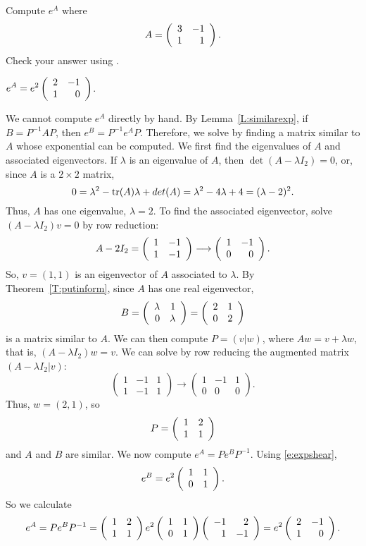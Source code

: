 \documentclass{ximera}
\begin{document}
\begin{exercise} \label{c6.5.6}
Compute $e^A$ where
\[
A = \left(\begin{array}{rr} 3 & -1\\ 1 &1\end{array}\right).
\]
Check your answer using \Matlabp.

\begin{solution}

\ans $\displaystyle e^A = e^2\left(\begin{array}{rr} 2 & -1\\ 1 &0\end{array}\right)$.

\soln We cannot compute $e^A$ directly by hand.  By Lemma~\ref{L:similarexp},
if $B = P^{-1}AP$, then $e^B = P^{-1}e^AP$.  Therefore, we solve by
finding a matrix similar to $A$ whose exponential can be computed.  
We first find the eigenvalues of $A$ and associated eigenvectors.
If $\lambda$ is an eigenvalue of $A$, then $\det(A - \lambda I_2) =
0$, or, since $A$ is a $2 \times 2$ matrix,
\[ 0 = \lambda^2 - {\rm tr}(A)\lambda + det(A) = \lambda^2 - 4\lambda +
4 = (\lambda - 2)^2. \]
Thus, $A$ has one eigenvalue, $\lambda = 2$.  To find the associated
eigenvector, solve $(A - \lambda I_2)v = 0$ by row reduction:
\[ A - 2I_2 = \left(\begin{array}{rr} 1 & -1\\ 1 &-1\end{array}\right) \longrightarrow
\left(\begin{array}{rr} 1 & -1\\ 0 &0\end{array}\right). \]
So, $v = (1,1)$ is an eigenvector of $A$ associated to $\lambda$.
By Theorem~\ref{T:putinform}, since $A$
has one real eigenvector, 
\[ B = \left(\begin{array}{rr} \lambda & 1\\ 0 &\lambda\end{array}\right) = \left(\begin{array}{rr} 2 & 1\\ 0 &2\end{array}\right) \]
is a matrix similar to $A$.  We can then compute $P = (v|w)$, where
$Aw = v + \lambda w$, that is, $(A - \lambda I_2)w = v$.  We can solve
by row reducing the augmented matrix $(A - \lambda I_2|v)$:
\[ \left(\begin{array}{rr|r} 1 & -1 & 1 \\ 1 & -1 & 1 \end{array}
\right) \longrightarrow \left(\begin{array}{rr|r} 1 & -1 & 1 \\
0 & 0 & 0 \end{array}\right). \]
Thus, $w = (2,1)$, so
\[ P = \left(\begin{array}{rr} 1 & 2\\ 1 &1\end{array}\right) \]
and $A$ and $B$ are similar.
We now compute $e^A = Pe^BP^{-1}$.  Using \eqref{e:expshear},
\[ e^B = e^2\left(\begin{array}{rr} 1 & 1\\ 0 &1\end{array}\right). \]
So we calculate 
\[ e^A = Pe^BP^{-1} = \left(\begin{array}{rr} 1 & 2\\ 1 &1\end{array}\right)e^2\left(\begin{array}{rr} 1 & 1\\ 0 &1\end{array}\right)
\left(\begin{array}{rr} -1 & 2\\ 1 &-1\end{array}\right) = e^2\left(\begin{array}{rr} 2 & -1\\ 1 &0\end{array}\right). \]



\end{solution}
\end{exercise}
\end{document}
